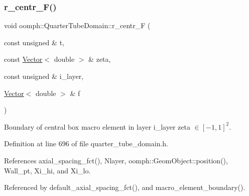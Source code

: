 \mbox{\label{classoomph_1_1QuarterTubeDomain_ace2c74d570fcb6a1ddf7a045ab3975c6}} 
\subsubsection{\texorpdfstring{r\+\_\+centr\+\_\+\+F()}{r\_centr\_F()}}
{\footnotesize\ttfamily void oomph\+::\+Quarter\+Tube\+Domain\+::r\+\_\+centr\+\_\+F (\begin{DoxyParamCaption}\item[{const unsigned \&}]{t,  }\item[{const \hyperlink{classoomph_1_1Vector}{Vector}$<$ double $>$ \&}]{zeta,  }\item[{const unsigned \&}]{i\+\_\+layer,  }\item[{\hyperlink{classoomph_1_1Vector}{Vector}$<$ double $>$ \&}]{f }\end{DoxyParamCaption})\hspace{0.3cm}{\ttfamily [private]}}



Boundary of central box macro element in layer i\+\_\+layer zeta $ \in [-1,1]^2 $. 



Definition at line 696 of file quarter\+\_\+tube\+\_\+domain.\+h.



References axial\+\_\+spacing\+\_\+fct(), Nlayer, oomph\+::\+Geom\+Object\+::position(), Wall\+\_\+pt, Xi\+\_\+hi, and Xi\+\_\+lo.



Referenced by default\+\_\+axial\+\_\+spacing\+\_\+fct(), and macro\+\_\+element\+\_\+boundary().

\mbox{\label{classoomph_1_1QuarterTubeDomain_ad150b2df8858d3936e7b6fb856de7ce1}} 
